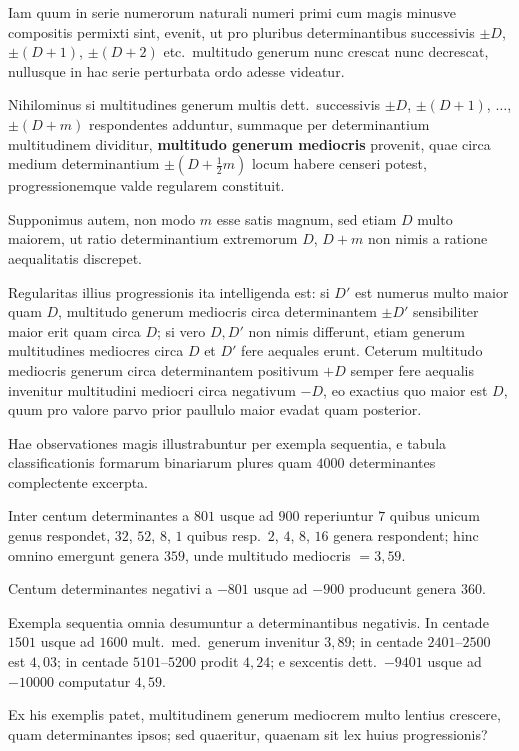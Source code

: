 \documentclass[12pt,a4paper]{article}
\theoremstyle{plain}
\theoremstyle{definition}
\theoremstyle{remark}
\begin{document}
Iam quum in serie numerorum naturali numeri primi cum magis minusve
compositis permixti sint, evenit, ut pro pluribus determinantibus successivis
$\pm D$, $\pm(D+1)$, $\pm(D+2)$ etc.\ multitudo generum nunc crescat nunc
decrescat, nullusque in hac serie perturbata ordo adesse videatur.

Nihilominus si multitudines generum multis dett.\ successivis $\pm D$, $\pm(D+1)$,
$\ldots$, $\pm(D+m)$ respondentes adduntur, summaque per determinantium
multitudinem dividitur, \textbf{multitudo generum mediocris} provenit, quae circa
medium determinantium $\pm(D + \tfrac{1}{2}m)$ locum habere censeri potest,
progressionemque valde regularem constituit.

Supponimus autem, non modo $m$ esse satis magnum, sed etiam $D$ multo
maiorem, ut ratio determinantium extremorum $D$, $D+m$ non nimis a ratione
aequalitatis discrepet.

Regularitas illius progressionis ita intelligenda est: si $D'$ est numerus multo
maior quam $D$, multitudo generum mediocris circa determinantem $\pm D'$
sensibiliter maior erit quam circa $D$; si vero $D, D'$ non nimis differunt, etiam
generum multitudines mediocres circa $D$ et $D'$ fere aequales erunt. Ceterum
multitudo mediocris generum circa determinantem positivum $+D$ semper fere
aequalis invenitur multitudini mediocri circa negativum $-D$, eo exactius
quo maior est $D$, quum pro valore parvo prior paullulo maior evadat quam
posterior.

Hae observationes magis illustrabuntur per exempla sequentia, e tabula
classificationis formarum binariarum plures quam $4000$ determinantes complectente
excerpta.

Inter centum determinantes a $801$ usque ad $900$ reperiuntur $7$ quibus
unicum genus respondet, $32$, $52$, $8$, $1$ quibus resp.\ $2$, $4$, $8$, $16$ genera
respondent; hinc omnino emergunt genera $359$, unde multitudo mediocris
$= 3{,}59$.

Centum determinantes negativi a $-801$ usque ad $-900$ producunt
genera $360$.

Exempla sequentia omnia desumuntur a determinantibus negativis. In centade
$1501$ usque ad $1600$ mult.\ med.\ generum invenitur $3{,}89$; in centade
$2401$--$2500$ est $4{,}03$; in centade $5101$--$5200$ prodit $4{,}24$; e sexcentis
dett.\ $-9401$ usque ad $-10000$ computatur $4{,}59$.

Ex his exemplis patet, multitudinem generum mediocrem multo lentius
crescere, quam determinantes ipsos; sed quaeritur, quaenam sit lex huius
progressionis?
\end{document}
